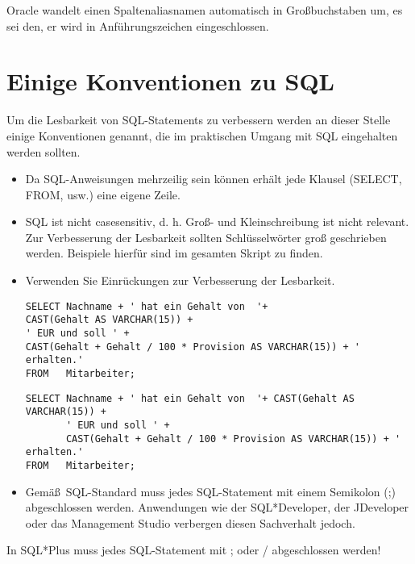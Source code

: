         \begin{merke}
          Oracle wandelt einen Spaltenaliasnamen automatisch in Großbuchstaben um, es sei den, er wird in Anführungszeichen eingeschlossen.
        \end{merke}
    \section{Einige Konventionen zu SQL}
      Um die Lesbarkeit von SQL-Statements zu verbessern werden an dieser Stelle einige Konventionen genannt, die im praktischen Umgang mit SQL eingehalten werden sollten.
      \begin{itemize}
        \item Da SQL-Anweisungen mehrzeilig sein können erhält jede Klausel (SELECT, FROM, usw.) eine eigene Zeile.
        \item SQL ist nicht casesensitiv, d. h. Groß- und Kleinschreibung ist nicht relevant. Zur Verbesserung der Lesbarkeit sollten Schlüsselwörter groß geschrieben werden. Beispiele hierfür sind im gesamten Skript zu finden.
        \item Verwenden Sie Einrückungen zur Verbesserung der Lesbarkeit.
          \begin{lstlisting}[language=ms_sql,caption={So nicht!},label=sql01_10]
SELECT Nachname + ' hat ein Gehalt von  '+
CAST(Gehalt AS VARCHAR(15)) +
' EUR und soll ' +
CAST(Gehalt + Gehalt / 100 * Provision AS VARCHAR(15)) + ' erhalten.'
FROM   Mitarbeiter;
          \end{lstlisting}
          \begin{lstlisting}[language=ms_sql,caption={Viel besser lesbar!},label=sql_01_11]
SELECT Nachname + ' hat ein Gehalt von  '+ CAST(Gehalt AS VARCHAR(15)) +
       ' EUR und soll ' +
       CAST(Gehalt + Gehalt / 100 * Provision AS VARCHAR(15)) + ' erhalten.'
FROM   Mitarbeiter;
          \end{lstlisting}
        \item Gemä\ss\ SQL-Standard muss jedes SQL-Statement mit einem Semikolon (;) abgeschlossen werden. Anwendungen wie der SQL*Developer, der JDeveloper oder das Management Studio verbergen diesen Sachverhalt jedoch.
      \end{itemize}
      \begin{merke}
        In SQL*Plus muss jedes SQL-Statement mit ; oder / abgeschlossen werden!
      \end{merke}
